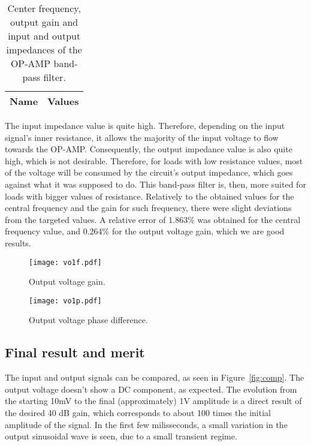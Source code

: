 \begin{table}[h]
  \centering
  \begin{tabular}{|l|r|}
    \hline    
    {\bf Name} & {\bf Values} \\ \hline
    
         
  \end{tabular}
  \caption{Center frequency, output gain and input and output impedances of the OP-AMP band-pass filter.}
  \label{tab:main}
\end{table}

The input impedance value is quite high. Therefore, depending on the input signal's inner resistance, it allows the majority of the input voltage to flow towards the OP-AMP. Consequently, the output impedance value is also quite high, which is not desirable. Therefore, for loads with low resistance values, most of the voltage will be consumed by the circuit's output impedance, which goes against what it was supposed to do. This band-pass filter is, then, more suited for loads with bigger values of resistance. 
Relatively to the obtained values for the central frequency and the gain for such frequency, there were slight deviations from the targeted values. A relative error of 1.863\% was obtained for the central frequency value, and 0.264\% for the output voltage gain, which we are good results.

\begin{figure}[h!] \centering
\texttt{[image: vo1f.pdf]}
\caption{Output voltage gain.}
\label{fig:gainstage}
\end{figure}

\begin{figure}[h!] \centering
\texttt{[image: vo1p.pdf]}
\caption{Output voltage phase difference.}
\label{fig:outputstage}
\end{figure}

\pagebreak
\subsection{Final result and merit}
The input and output signals can be compared, as seen in Figure~\ref{fig:comp}. The output voltage doesn't show a DC component, as expected. The evolution from the starting 10mV to the final (approximately) 1V amplitude is a direct result of the desired 40 dB gain, which corresponds to about 100 times the initial amplitude of the signal. In the first few milisseconds, a small variation in the output sinusoidal wave is seen, due to a small transient regime.


